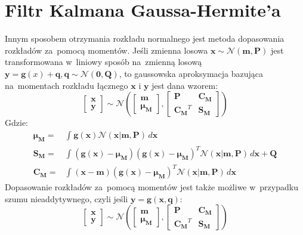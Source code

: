 \section{Filtr Kalmana Gaussa-Hermite'a} \label{GHKF}
Innym sposobem otrzymania rozkładu normalnego jest metoda dopasowania rozkładów za~pomocą momentów. Jeśli zmienna losowa $\boldsymbol{x} \sim \mathcal{N}(\boldsymbol{m},\boldsymbol{P})$ jest transformowana w~liniowy sposób na~zmienną losową $\boldsymbol{y}=\boldsymbol{g}(x)+\boldsymbol{q}, \boldsymbol{q} \sim \mathcal{N}(\boldsymbol{0},\boldsymbol{Q})$, to gaussowska aproksymacja bazująca na~momentach rozkładu łącznego $\boldsymbol{x}$ i $\boldsymbol{y}$ jest dana wzorem:  
\begin{equation} \label{eq:GaussianMomentMatchingAdditive}
	\begin{bmatrix}
	\boldsymbol{x} \\
	\boldsymbol{y}
	\end{bmatrix} \sim
	\mathcal{N}(
	\begin{bmatrix}
	\boldsymbol{m} \\
	\boldsymbol{\mu_M}
	\end{bmatrix},
	\begin{bmatrix}
	\boldsymbol{P} & \boldsymbol{C_M} \\
	\boldsymbol{C_M}^T & \boldsymbol{S_M}
	\end{bmatrix}
	)
\end{equation}
Gdzie:
\begin{align}\label{eq:GaussianMomentMatchingAdditiveWhere}
\boldsymbol{\mu_M} =& \int_{}^{}\boldsymbol{g}(\boldsymbol{x})\mathcal{N}(\boldsymbol{x}|\boldsymbol{m, \boldsymbol{P}}) \,d\boldsymbol{x} \nonumber \\
\boldsymbol{S_M}=&\int_{}^{}(\boldsymbol{g}(\boldsymbol{x}) - \boldsymbol{\mu_M})(\boldsymbol{g}(\boldsymbol{x}) - \boldsymbol{\mu_M})^T \mathcal{N}(\boldsymbol{x}|\boldsymbol{m, \boldsymbol{P}}) \,d\boldsymbol{x} + \boldsymbol{Q} \nonumber \\
\boldsymbol{C_M}=&\int_{}^{}(\boldsymbol{x} - \boldsymbol{m})(\boldsymbol{g}(\boldsymbol{x}) - \boldsymbol{\mu_M})^T \mathcal{N}(\boldsymbol{x}|\boldsymbol{m, \boldsymbol{P}}) \,d\boldsymbol{x}
\end{align}
Dopasowanie rozkładów za~pomocą momentów jest także możliwe w~przypadku szumu nieaddytywnego, czyli jeśli $\boldsymbol{y}=\boldsymbol{g}(\boldsymbol{x}, \boldsymbol{q})$:
\begin{equation} \label{eq:GaussianMomentMatchingNonAdditive}
\begin{bmatrix}
\boldsymbol{x} \\
\boldsymbol{y}
\end{bmatrix} \sim
\mathcal{N}(
\begin{bmatrix}
\boldsymbol{m} \\
\boldsymbol{\mu_M}
\end{bmatrix},
\begin{bmatrix}
\boldsymbol{P} & \boldsymbol{C_M} \\
\boldsymbol{C_M}^T & \boldsymbol{S_M}
\end{bmatrix}
)
\end{equation}
